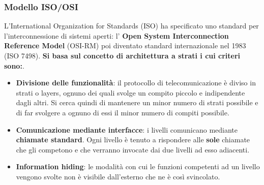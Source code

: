 \documentclass[11pt,a4paper]{article}
\theoremstyle{definition}
\begin{document}
\subsubsection{Modello ISO/OSI}
L’International Organization for Standards (ISO) ha specificato
uno standard per l’interconnessione di sistemi aperti: l' \textbf{Open System Interconnection Reference Model} (OSI-RM) poi diventato standard internazionale nel 1983 (ISO 7498). \textbf{Si basa sul concetto di architettura a strati i cui criteri sono:}.
\begin{itemize}
	\item \textbf{Divisione delle funzionalità}: il protocollo di telecomunicazione è diviso in strati o layers, ognuno dei quali svolge un compito piccolo e indipendente dagli altri.\newline
	      Si cerca quindi di mantenere un minor numero di strati possibile e di far svolgere a ognuno di essi il minor numero di compiti possibile.
	\item \textbf{Comunicazione mediante interfacce}: i livelli comunicano mediante \textbf{chiamate standard}. Ogni livello è tenuto a rispondere alle \textbf{sole} chiamate che gli competono e che verranno
	      invocate dai due livelli ad esso adiacenti.
	\item \textbf{Information hiding}: le modalità con cui le funzioni competenti ad un livello
	      vengono svolte non è visibile dall'esterno che ne è così
	      svincolato.
\end{itemize}
\end{document}
